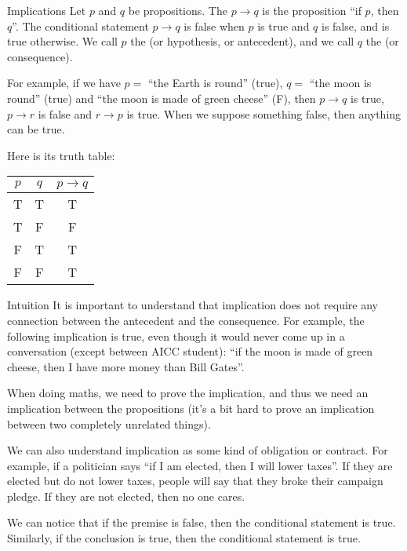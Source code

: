 \documentclass{article}
\begin{document}
\begin{parag}{Implications}
    Let $p$ and $q$ be propositions. The  $p \to q$ is the proposition ``if $p$, then $q$''. The conditional statement $p \to q$ is false when $p$ is true and $q$ is false, and is true otherwise. We call $p$ the  (or hypothesis, or antecedent), and we call $q$ the  (or consequence). 

    For example, if we have $p = $ ``the Earth is round'' (true), $q = $ ``the moon is round'' (true) and ``the moon is made of green cheese'' (F), then $p \to q$ is true, $p \to r$ is false and $r \to p$ is true. When we suppose something false, then anything can be true.

    Here is its truth table:
    \begin{center}
    \begin{tabular}{cc|c}
        $p$ & $q$ & $p \to q$  \\
        \hline
        T & T & T  \\
        T & F & F  \\
        F & T & T  \\
        F & F & T
    \end{tabular}
    \end{center}

    \begin{subparag}{Intuition}
        It is important to understand that implication does not require any connection between the antecedent and the consequence. For example, the following implication is true, even though it would never come up in a conversation (except between AICC student): ``if the moon is made of green cheese, then I have more money than Bill Gates''.

        When doing maths, we need to prove the implication, and thus we need an implication between the propositions (it's a bit hard to prove an implication between two completely unrelated things).

        We can also understand implication as some kind of obligation or contract. For example, if a politician says ``if I am elected, then I will lower taxes''. If they are elected but do not lower taxes, people will say that they broke their campaign pledge. If they are not elected, then no one cares.

        We can notice that if the premise is false, then the conditional statement is true. Similarly, if the conclusion is true, then the conditional statement is true.
    \end{subparag}
    

\end{parag}
\end{document}
